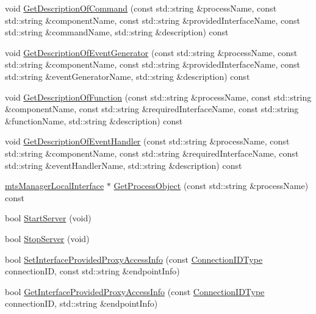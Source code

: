 \begin{DoxyCompactItemize}
\item 
void \hyperlink{classmts_manager_global_a6ce2a921e276e66e7fa993a209eca493}{Get\-Description\-Of\-Command} (const std\-::string \&process\-Name, const std\-::string \&component\-Name, const std\-::string \&provided\-Interface\-Name, const std\-::string \&command\-Name, std\-::string \&description) const 
\item 
void \hyperlink{classmts_manager_global_a940ee93980abe9f06c3bff805c5b638a}{Get\-Description\-Of\-Event\-Generator} (const std\-::string \&process\-Name, const std\-::string \&component\-Name, const std\-::string \&provided\-Interface\-Name, const std\-::string \&event\-Generator\-Name, std\-::string \&description) const 
\item 
void \hyperlink{classmts_manager_global_ad69f9c7dba89ec7528bf4a1effbaaf92}{Get\-Description\-Of\-Function} (const std\-::string \&process\-Name, const std\-::string \&component\-Name, const std\-::string \&required\-Interface\-Name, const std\-::string \&function\-Name, std\-::string \&description) const 
\item 
void \hyperlink{classmts_manager_global_a6b01678cac68950588380cc576e8b856}{Get\-Description\-Of\-Event\-Handler} (const std\-::string \&process\-Name, const std\-::string \&component\-Name, const std\-::string \&required\-Interface\-Name, const std\-::string \&event\-Handler\-Name, std\-::string \&description) const 
\item 
\hyperlink{classmts_manager_local_interface}{mts\-Manager\-Local\-Interface} $\ast$ \hyperlink{classmts_manager_global_a345d1abcd9982e1ddf1c0dbb1e9a26c3}{Get\-Process\-Object} (const std\-::string \&process\-Name) const 
\item 
bool \hyperlink{classmts_manager_global_a6e0773b090ddded56d7bdb57ad61658d}{Start\-Server} (void)
\item 
bool \hyperlink{classmts_manager_global_a815cf7a0880ba63b00bd79a06a564601}{Stop\-Server} (void)
\item 
bool \hyperlink{classmts_manager_global_a27ab6be87f292f862b05551bf786bcfd}{Set\-Interface\-Provided\-Proxy\-Access\-Info} (const \hyperlink{mts_forward_declarations_8h_ad3543bb11742e1766374ec96016d6547}{Connection\-I\-D\-Type} connection\-I\-D, const std\-::string \&endpoint\-Info)
\item 
bool \hyperlink{classmts_manager_global_a5b746df511febca8caca1482341f1595}{Get\-Interface\-Provided\-Proxy\-Access\-Info} (const \hyperlink{mts_forward_declarations_8h_ad3543bb11742e1766374ec96016d6547}{Connection\-I\-D\-Type} connection\-I\-D, std\-::string \&endpoint\-Info)

\end{DoxyCompactItemize}
